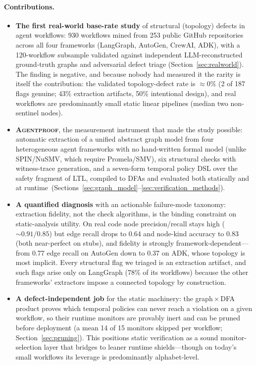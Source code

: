 \paragraph{Contributions.}
\begin{itemize}
  \item \textbf{The first real-world base-rate study} of structural
  (topology) defects in agent workflows: 930 workflows mined from 253
  public GitHub repositories across all four frameworks (LangGraph,
  AutoGen, CrewAI, ADK), with a 120-workflow subsample validated against
  independent LLM-reconstructed ground-truth graphs and adversarial defect
  triage (Section~\ref{sec:realworld}). The finding is negative, and
  because nobody had measured it the rarity is itself the contribution:
  the validated topology-defect rate is ${\approx}0\%$ (2 of 187 flags
  genuine; 43\% extraction artifacts, 50\% intentional design), and real
  workflows are predominantly small static linear pipelines (median two
  non-sentinel nodes).
  \item \textbf{\textsc{Agentproof}}, the measurement instrument that made
  the study possible: automatic extraction of a unified abstract graph
  model from four heterogeneous agent frameworks with no hand-written
  formal model (unlike SPIN/NuSMV, which require Promela/SMV), six
  structural checks with witness-trace generation, and a seven-form
  temporal policy DSL over the safety fragment of LTL, compiled to DFAs
  and evaluated both statically and at
  runtime~(Sections~\ref{sec:graph_model}--\ref{sec:verification_methods}).
  \item \textbf{A quantified diagnosis} with an actionable failure-mode
  taxonomy: extraction fidelity, not the check algorithms, is the binding
  constraint on static-analysis utility. On real code node
  precision/recall stays high (${\sim}0.91/0.85$) but edge recall drops
  to 0.64 and node-kind accuracy to 0.83 (both near-perfect on stubs),
  and fidelity is strongly framework-dependent---from 0.77 edge recall on
  AutoGen down to 0.37 on ADK, whose topology is most implicit. Every
  structural flag we triaged is an extraction artifact, and such flags
  arise only on LangGraph (78\% of its workflows) because the other
  frameworks' extractors impose a connected topology by construction.
  \item \textbf{A defect-independent job} for the static machinery: the
  graph\,$\times$\,DFA product proves which temporal policies can never
  reach a violation on a given workflow, so their runtime monitors are
  provably inert and can be pruned before deployment (a mean 14 of 15
  monitors skipped per workflow; Section~\ref{sec:pruning}). This
  positions static verification as a sound monitor-selection layer that
  bridges to leaner runtime shields---though on today's small workflows
  its leverage is predominantly alphabet-level.
\end{itemize}

